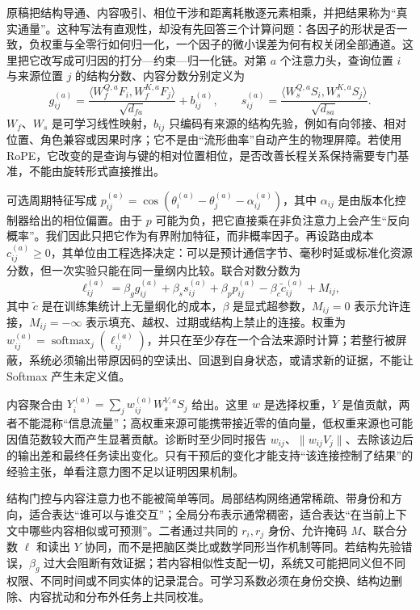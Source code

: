 原稿把结构导通、内容吸引、相位干涉和距离耗散逐元素相乘，并把结果称为“真实通量”。这种写法有直观性，却没有先回答三个计算问题：各因子的形状是否一致，负权重与全零行如何归一化，一个因子的微小误差为何有权关闭全部通道。这里把它改写成可归因的打分—约束—归一化链。对第 $a$ 个注意力头，查询位置 $i$ 与来源位置 $j$ 的结构分数、内容分数分别定义为
\begin{equation}
g^{(a)}_{ij}=\frac{\langle W^{Q,a}_fF_i,W^{K,a}_fF_j\rangle}{\sqrt{d_{fa}}}+b^{(a)}_{ij},
\qquad
s^{(a)}_{ij}=\frac{\langle W^{Q,a}_sS_i,W^{K,a}_sS_j\rangle}{\sqrt{d_{sa}}}.
\end{equation}
$W_f$、$W_s$ 是可学习线性映射，$b_{ij}$ 只编码有来源的结构先验，例如有向邻接、相对位置、角色兼容或因果时序；它不是由“流形曲率”自动产生的物理屏障。若使用 RoPE，它改变的是查询与键的相对位置相位，是否改善长程关系保持需要专门基准，不能由旋转形式直接推出。

可选周期特征写成 $p^{(a)}_{ij}=\cos(\theta^{(a)}_i-\theta^{(a)}_j-\alpha^{(a)}_{ij})$，其中 $\alpha_{ij}$ 是由版本化控制器给出的相位偏置。由于 $p$ 可能为负，把它直接乘在非负注意力上会产生“反向概率”。我们因此只把它作为有界附加特征，而非概率因子。再设路由成本 $c^{(a)}_{ij}\geq0$，其单位由工程选择决定：可以是预计通信字节、毫秒时延或标准化资源分数，但一次实验只能在同一量纲内比较。联合对数分数为
\begin{equation}
\ell^{(a)}_{ij}=\beta_g g^{(a)}_{ij}+\beta_s s^{(a)}_{ij}+\beta_p p^{(a)}_{ij}-\beta_c\widetilde c^{(a)}_{ij}+M_{ij},
\end{equation}
其中 $\widetilde c$ 是在训练集统计上无量纲化的成本，$\beta$ 是显式超参数，$M_{ij}=0$ 表示允许连接，$M_{ij}=-\infty$ 表示填充、越权、过期或结构上禁止的连接。权重为 $w^{(a)}_{ij}=\operatorname{softmax}_j(\ell^{(a)}_{ij})$，并只在至少存在一个合法来源时计算；若整行被屏蔽，系统必须输出带原因码的空读出、回退到自身状态，或请求新的证据，不能让 Softmax 产生未定义值。

内容聚合由 $Y^{(a)}_i=\sum_jw^{(a)}_{ij}W^{V,a}_sS_j$ 给出。这里 $w$ 是选择权重，$Y$ 是值贡献，两者不能混称“信息流量”；高权重来源可能携带接近零的值向量，低权重来源也可能因值范数较大而产生显著贡献。诊断时至少同时报告 $w_{ij}$、$\lVert w_{ij}V_j\rVert$、去除该边后的输出差和最终任务读出变化。只有干预后的变化才能支持“该连接控制了结果”的经验主张，单看注意力图不足以证明因果机制。

结构门控与内容注意力也不能被简单等同。局部结构网络通常稀疏、带身份和方向，适合表达“谁可以与谁交互”；全局分布表示通常稠密，适合表达“在当前上下文中哪些内容相似或可预测”。二者通过共同的 $r_i,r_j$ 身份、允许掩码 $M$、联合分数 $\ell$ 和读出 $Y$ 协同，而不是把脑区类比或数学同形当作机制等同。若结构先验错误，$\beta_g$ 过大会阻断有效证据；若内容相似性支配一切，系统又可能把同义但不同权限、不同时间或不同实体的记录混合。可学习系数必须在身份交换、结构边删除、内容扰动和分布外任务上共同校准。

